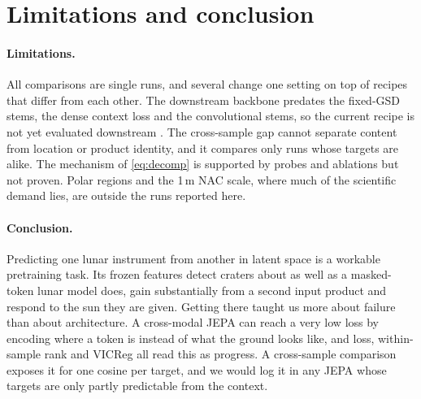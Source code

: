 \section{Limitations and conclusion}
\label{sec:conclusion}

\paragraph{Limitations.} All comparisons are single runs, and several change one setting on top of recipes that differ from each other. The downstream backbone predates the fixed-GSD stems, the dense context loss and the convolutional stems, so the current recipe is not yet evaluated downstream . The cross-sample gap cannot separate content from location or product identity, and it compares only runs whose targets are alike. The mechanism of \cref{eq:decomp} is supported by probes and ablations but not proven. Polar regions and the 1\,m NAC scale, where much of the scientific demand lies, are outside the runs reported here.

\paragraph{Conclusion.} Predicting one lunar instrument from another in latent space is a workable pretraining task. Its frozen features detect craters about as well as a masked-token lunar model does, gain substantially from a second input product and respond to the sun they are given. Getting there taught us more about failure than about architecture. A cross-modal JEPA can reach a very low loss by encoding where a token is instead of what the ground looks like, and loss, within-sample rank and VICReg all read this as progress. A cross-sample comparison exposes it for one cosine per target, and we would log it in any JEPA whose targets are only partly predictable from the context.
